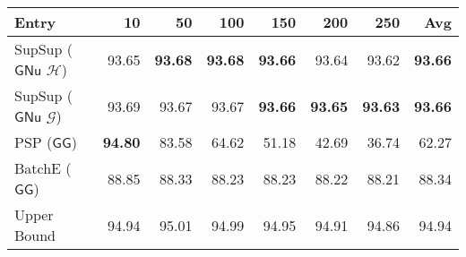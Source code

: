 \begin{tabular}{lrrrrrrr}
\toprule
                                              Entry &    10 &    50 &   100 &   150 &   200 &   250 &   Avg \\
\midrule
 SupSup ($\ensuremath{\mathsf{GNu}}$ $\mathcal{H}$) & 93.65 & \textbf{93.68} & \textbf{93.68} & \textbf{93.66} & 93.64 & 93.62 & \textbf{93.66} \\
 SupSup ($\ensuremath{\mathsf{GNu}}$ $\mathcal{G}$) & 93.69 & 93.67 & 93.67 & \textbf{93.66} & \textbf{93.65} & \textbf{93.63} & \textbf{93.66} \\
                   PSP ($\ensuremath{\mathsf{GG}}$) & \textbf{94.80} & 83.58 & 64.62 & 51.18 & 42.69 & 36.74 & 62.27 \\
                BatchE ($\ensuremath{\mathsf{GG}}$) & 88.85 & 88.33 & 88.23 & 88.23 & 88.22 & 88.21 & 88.34 \\
                \midrule
                                        Upper Bound & 94.94 & 95.01 & 94.99 & 94.95 & 94.91 & 94.86 & 94.94 \\
\bottomrule
\end{tabular}
